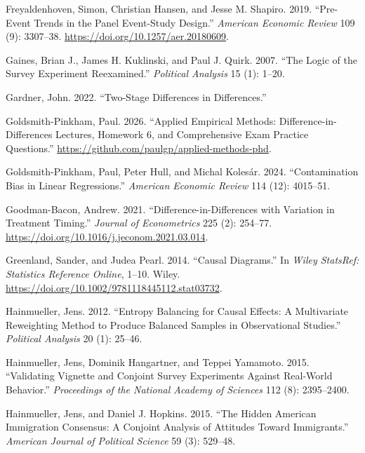 \documentclass[
]{article}
\newlength{\cslhangindent}
\newenvironment{CSLReferences}[2] %
 {\begin{list}{}{%
  \setlength{\itemindent}{0pt}
  \setlength{\leftmargin}{0pt}
  \setlength{\parsep}{0pt}
  \ifodd #1
   \setlength{\leftmargin}{\cslhangindent}
   \setlength{\itemindent}{-1\cslhangindent}
  \fi
  \setlength{\itemsep}{#2\baselineskip}}}
 {\end{list}}
\begin{document}
\begin{CSLReferences}{1}{0}
Freyaldenhoven, Simon, Christian Hansen, and Jesse M. Shapiro. 2019. {``Pre-Event Trends in the Panel Event-Study Design.''} \emph{American Economic Review} 109 (9): 3307--38. \url{https://doi.org/10.1257/aer.20180609}.

Gaines, Brian J., James H. Kuklinski, and Paul J. Quirk. 2007. {``The Logic of the Survey Experiment Reexamined.''} \emph{Political Analysis} 15 (1): 1--20.

Gardner, John. 2022. {``Two-Stage Differences in Differences.''}

Goldsmith-Pinkham, Paul. 2026. {``Applied Empirical Methods: Difference-in-Differences Lectures, Homework 6, and Comprehensive Exam Practice Questions.''} \url{https://github.com/paulgp/applied-methods-phd}.

Goldsmith-Pinkham, Paul, Peter Hull, and Michal Kolesár. 2024. {``Contamination Bias in Linear Regressions.''} \emph{American Economic Review} 114 (12): 4015--51.

Goodman-Bacon, Andrew. 2021. {``Difference-in-Differences with Variation in Treatment Timing.''} \emph{Journal of Econometrics} 225 (2): 254--77. \url{https://doi.org/10.1016/j.jeconom.2021.03.014}.

Greenland, Sander, and Judea Pearl. 2014. {``Causal Diagrams.''} In \emph{Wiley StatsRef: Statistics Reference Online}, 1--10. Wiley. \url{https://doi.org/10.1002/9781118445112.stat03732}.

Hainmueller, Jens. 2012. {``Entropy Balancing for Causal Effects: A Multivariate Reweighting Method to Produce Balanced Samples in Observational Studies.''} \emph{Political Analysis} 20 (1): 25--46.

Hainmueller, Jens, Dominik Hangartner, and Teppei Yamamoto. 2015. {``Validating Vignette and Conjoint Survey Experiments Against Real-World Behavior.''} \emph{Proceedings of the National Academy of Sciences} 112 (8): 2395--2400.

Hainmueller, Jens, and Daniel J. Hopkins. 2015. {``The Hidden American Immigration Consensus: A Conjoint Analysis of Attitudes Toward Immigrants.''} \emph{American Journal of Political Science} 59 (3): 529--48.


\end{CSLReferences}
\end{document}
